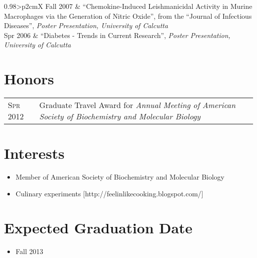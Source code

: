 \documentclass[a4paper, oneside, final]{scrartcl}
\begin{document}
\begin{center}
\begin{tabularx}{0.98\linewidth}{>{\raggedleft\scshape}p{2cm}X}
Fall 2007 & \small  {``Chemokine-Induced Leishmanicidal Activity in Murine Macrophages via the Generation of Nitric Oxide'', from the ``Journal of Infectious
Diseases'', \em {Poster Presentation, University of Calcutta }}\\

Spr 2006 & \small  {``Diabetes - Trends in Current Research'', \em{Poster Presentation, University of Calcutta}}\\

\end{tabularx}

\section{Honors}
\begin{tabularx}{0.98\linewidth}{>{\raggedleft\scshape}p{2cm}X}
Spr 2012 & \small {Graduate Travel Award for \em {Annual Meeting of American Society of Biochemistry and Molecular Biology}}\\
\end{tabularx}

\section{Interests}

\begin{itemize}
\small
\item Member of American Society of Biochemistry and Molecular Biology\\
\item Culinary experiments  [http://feelinlikecooking.blogspot.com/]
\end{itemize} 


\section{Expected Graduation Date}
\begin{itemize}
\small
\item Fall 2013
\end{itemize} 



\end{center}
\end{document}
